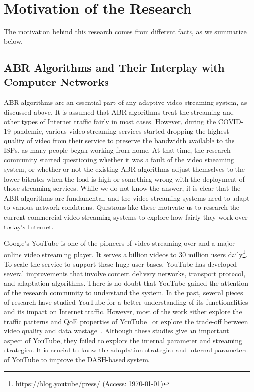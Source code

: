 \section{Motivation of the Research}
The motivation behind this research comes from different facts, as we summarize below. 

\subsection{ABR Algorithms and Their Interplay with Computer Networks}
\Ac{ABR} algorithms are an essential part of any adaptive video streaming system, as discussed above. It is assumed that \ac{ABR} algorithms treat the streaming and other types of Internet traffic fairly in most cases. However, during the COVID-19 pandemic, various video streaming services started dropping the highest quality of video from their service to preserve the bandwidth available to the \acp{ISP}, as many people began working from home. At that time, the research community started questioning whether it was a fault of the video streaming system, or whether or not the existing \ac{ABR} algorithms adjust themselves to the lower bitrates when the load is high or something wrong with the deployment of those streaming services. While we do not know the answer, it is clear that the \ac{ABR} algorithms are fundamental, and the video streaming systems need to adapt to various network conditions. Questions like these motivate us to research the current commercial video streaming systems to explore how fairly they work over today's Internet.

Google's YouTube is one of the pioneers of video streaming over  and a major online video streaming player. It serves a billion videos to 30 million users daily\footnote{\url{https://blog.youtube/press/} (Access: \today)}. To scale the service to support these huge user-bases, YouTube has developed several improvements that involve content delivery networks, transport protocol, and adaptation algorithms. There is no doubt that YouTube gained the attention of the research community to understand the system. In the past, several pieces of research have studied YouTube for a better understanding of its functionalities and its impact on Internet traffic. However, most of the work either explore the traffic patterns and \ac{QoE} properties of YouTube~\cite{gill2007youtube,krishnappa2013dashing,wamser2016modeling,wamser2015poster,6757893ieeeexp,7129790ieeeexp} or explore the trade-off between video quality and data wastage~\cite{sieber2015cost,seufert2015youtube,sieber2016sacrificing}. Although these studies give an important aspect of YouTube, they failed to explore the internal parameter and streaming strategies. It is crucial to know the adaptation strategies and internal parameters of YouTube to improve the DASH-based system.

